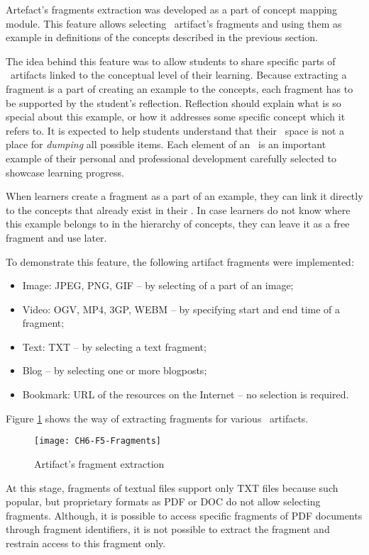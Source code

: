 Artefact's fragments extraction was developed as a part of concept mapping
module. This feature allows selecting \ep~artifact's fragments and using
them as example in definitions of the concepts described in the previous
section.

The idea behind this feature was to allow students to share specific parts of
\ep~artifacts linked to the conceptual level of their learning. Because
extracting a fragment is a part of creating an example to the concepts, each
fragment has to be supported by the student's reflection. Reflection should
explain what is so special about this example, or how it addresses some specific
concept which it refers to. It is expected to help students understand that
their \ep~space is not a place for \textit{dumping} all possible items. Each
element of an \ep~is an important example of their personal and professional
development carefully selected to showcase learning progress.

When learners create a fragment as a part of an example, they can link it
directly to the concepts that already exist in their \ep. In case learners do
not know where this example belongs to in the hierarchy of concepts, they can
leave it as a free fragment and use later.

To demonstrate this feature, the following artifact fragments were implemented:

\begin{itemize}
  \item Image: JPEG, PNG, GIF -- by selecting of a part of an image;
  \item Video: OGV, MP4, 3GP, WEBM -- by specifying start and end time of a
  fragment;
  \item Text: TXT -- by selecting a text fragment;
  \item Blog -- by selecting one or more blogposts;
  \item Bookmark: URL of the resources on the Internet -- no selection is
  required.
\end{itemize} 

Figure \ref{fig:frag} shows the way of extracting fragments for various
\ep~artifacts.

\begin{figure}[h!]
\centering
\texttt{[image: CH6-F5-Fragments]}
\caption{Artifact's fragment extraction}
\label{fig:frag}
\end{figure}

\FloatBarrier

At this stage, fragments of textual files support only TXT files because such
popular, but proprietary formats as PDF or DOC do not allow selecting fragments.
Although, it is possible to access specific fragments of PDF documents through
fragment identifiers, it is not possible to extract the fragment and restrain
access to this fragment only.

